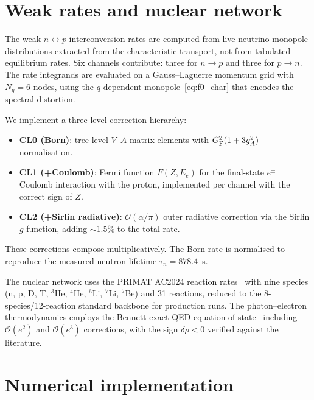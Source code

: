 \documentclass[a4paper,11pt]{article}
\newcommand{\order}{\mathcal{O}}
\begin{document}
\section{Weak rates and nuclear network}\label{sec:weak_rates}

The weak $n\leftrightarrow p$ interconversion rates are computed from live neutrino monopole distributions extracted from the characteristic transport, not from tabulated equilibrium rates.  Six channels contribute: three for $n\to p$ and three for $p\to n$.  The rate integrands are evaluated on a Gauss--Laguerre momentum grid with $N_q = 6$ nodes, using the $q$-dependent monopole~\eqref{eq:f0_char} that encodes the spectral distortion.

We implement a three-level correction hierarchy:
\begin{itemize}
\item \textbf{CL0 (Born)}: tree-level $V$--$A$ matrix elements with $G_{\rm F}^2(1+3g_A^2)$ normalisation.
\item \textbf{CL1 (+Coulomb)}: Fermi function $F(Z,E_e)$ for the final-state $e^\pm$ Coulomb interaction with the proton, implemented per channel with the correct sign of $Z$.
\item \textbf{CL2 (+Sirlin radiative)}: $\order(\alpha/\pi)$ outer radiative correction via the Sirlin $g$-function, adding $\sim$1.5\% to the total rate.
\end{itemize}
These corrections compose multiplicatively.  The Born rate is normalised to reproduce the measured neutron lifetime $\tau_n = 878.4$~s.

The nuclear network uses the PRIMAT AC2024 reaction rates~\cite{PitrouPRIMAT2021} with nine species (n, p, D, T, $^3$He, $^4$He, $^6$Li, $^7$Li, $^7$Be) and 31 reactions, reduced to the 8-species/12-reaction standard backbone for production runs.  The photon--electron thermodynamics employs the Bennett exact QED equation of state~\cite{Bennett2020} including $\order(e^2)$ and $\order(e^3)$ corrections, with the sign $\delta\rho < 0$ verified against the literature.


\section{Numerical implementation}\label{sec:numerics}
\end{document}
